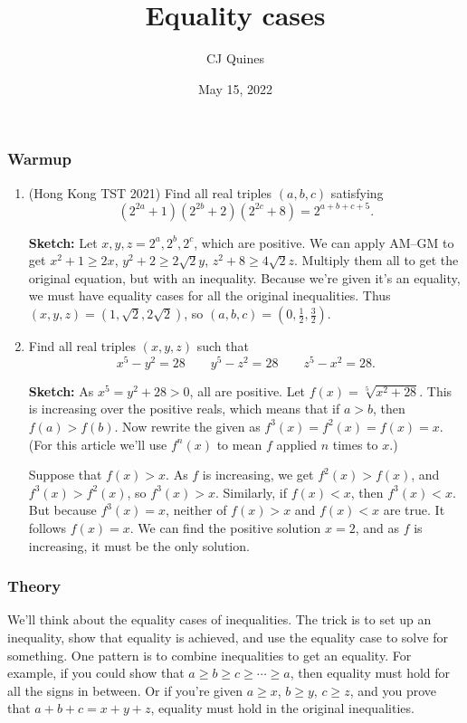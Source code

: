 \documentclass[11pt,paper=letter]{scrartcl}
\begin{document}
\title{Equality cases}
\author{CJ Quines}
\date{May 15, 2022}

\maketitle

\subsubsection*{Warmup}

\begin{enumerate}

\item (Hong Kong TST 2021) Find all real triples $(a,b,c)$ satisfying
\[(2^{2a}+1)(2^{2b}+2)(2^{2c}+8)=2^{a+b+c+5}.\]

\textbf{Sketch:} Let $x, y, z = 2^a, 2^b, 2^c$, which are positive. We can apply AM--GM to get $x^2 + 1 \ge 2x$, $y^2 + 2 \ge 2\sqrt2 y$, $z^2 + 8 \ge 4\sqrt2 z$. Multiply them all to get the original equation, but with an inequality. Because we're given it's an equality, we must have equality cases for all the original inequalities. Thus $(x, y, z) = (1, \sqrt2, 2\sqrt2)$, so $(a, b, c) = (0, \frac12, \frac32)$.

\item Find all real triples $(x, y, z)$ such that \[
x^5 - y^2 = 28 \qquad
y^5 - z^2 = 28 \qquad
z^5 - x^2 = 28.
\]

\textbf{Sketch:} As $x^5 = y^2 + 28 > 0$, all are positive. Let $f(x) = \sqrt[5]{x^2 + 28}$. This is increasing over the positive reals, which means that if $a > b$, then $f(a) > f(b)$. Now rewrite the given as $f^3(x) = f^2(x) = f(x) = x$. (For this article we'll use $f^n(x)$ to mean $f$ applied $n$ times to $x$.)

Suppose that $f(x) > x$. As $f$ is increasing, we get $f^2(x) > f(x)$, and $f^3(x) > f^2(x)$, so $f^3(x) > x$. Similarly, if $f(x) < x$, then $f^3(x) < x$. But because $f^3(x) = x$, neither of $f(x) > x$ and $f(x) < x$ are true. It follows $f(x) = x$. We can find the positive solution $x = 2$, and as $f$ is increasing, it must be the only solution.

\end{enumerate}

\subsubsection*{Theory}

We'll think about the equality cases of inequalities. The trick is to set up an inequality, show that equality is achieved, and use the equality case to solve for something. One pattern is to combine inequalities to get an equality. For example, if you could show that $a \ge b \ge c \ge \cdots \ge a$, then equality must hold for all the signs in between. Or if you're given $a \ge x$, $b \ge y$, $c \ge z$, and you prove that $a + b + c = x + y + z$, equality must hold in the original inequalities.
\end{document}
